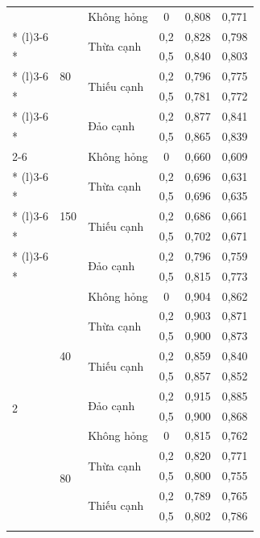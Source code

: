 {\begin{longtable}{lllccc}
 & \multirow{7}{*}{80} & \multirow{1}{*}{Không hỏng} & 0 & 0,808 & 0,771 \\*
\cmidrule(l){3-6}
 &  & \multirow{2}{*}{Thừa cạnh} & 0,2 & 0,828 & 0,798 \\*
 &  &  & 0,5 & 0,840 & 0,803 \\*
\cmidrule(l){3-6}
 &  & \multirow{2}{*}{Thiếu cạnh} & 0,2 & 0,796 & 0,775 \\*
 &  &  & 0,5 & 0,781 & 0,772 \\*
\cmidrule(l){3-6}
 &  & \multirow{2}{*}{Đảo cạnh} & 0,2 & 0,877 & 0,841 \\*
 &  &  & 0,5 & 0,865 & 0,839 \\
\cmidrule(l){2-6}
 & \multirow{7}{*}{150} & \multirow{1}{*}{Không hỏng} & 0 & 0,660 & 0,609 \\*
\cmidrule(l){3-6}
 &  & \multirow{2}{*}{Thừa cạnh} & 0,2 & 0,696 & 0,631 \\*
 &  &  & 0,5 & 0,696 & 0,635 \\*
\cmidrule(l){3-6}
 &  & \multirow{2}{*}{Thiếu cạnh} & 0,2 & 0,686 & 0,661 \\*
 &  &  & 0,5 & 0,702 & 0,671 \\*
\cmidrule(l){3-6}
 &  & \multirow{2}{*}{Đảo cạnh} & 0,2 & 0,796 & 0,759 \\*
 &  &  & 0,5 & 0,815 & 0,773 \\
\midrule
\multirow{21}{*}{2} & \multirow{7}{*}{40} & \multirow{1}{*}{Không hỏng} & 0 & 0,904 & 0,862 \\*
\cmidrule(l){3-6}
 &  & \multirow{2}{*}{Thừa cạnh} & 0,2 & 0,903 & 0,871 \\*
 &  &  & 0,5 & 0,900 & 0,873 \\*
\cmidrule(l){3-6}
 &  & \multirow{2}{*}{Thiếu cạnh} & 0,2 & 0,859 & 0,840 \\*
 &  &  & 0,5 & 0,857 & 0,852 \\*
\cmidrule(l){3-6}
 &  & \multirow{2}{*}{Đảo cạnh} & 0,2 & 0,915 & 0,885 \\*
 &  &  & 0,5 & 0,900 & 0,868 \\
\cmidrule(l){2-6}
 & \multirow{7}{*}{80} & \multirow{1}{*}{Không hỏng} & 0 & 0,815 & 0,762 \\*
\cmidrule(l){3-6}
 &  & \multirow{2}{*}{Thừa cạnh} & 0,2 & 0,820 & 0,771 \\*
 &  &  & 0,5 & 0,800 & 0,755 \\*
\cmidrule(l){3-6}
 &  & \multirow{2}{*}{Thiếu cạnh} & 0,2 & 0,789 & 0,765 \\*
 &  &  & 0,5 & 0,802 & 0,786 \\*

\end{longtable}}
